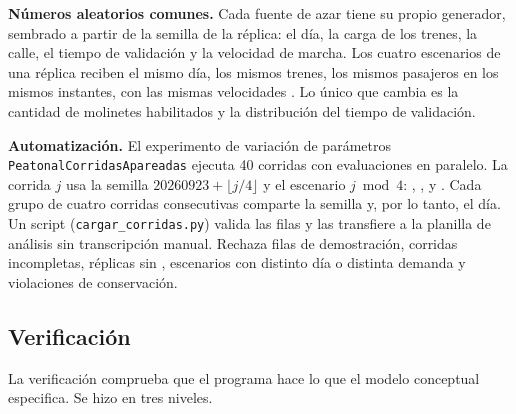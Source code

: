 \textbf{Números aleatorios comunes.} Cada fuente de azar tiene su propio generador, sembrado a partir de la
semilla de la réplica: el día, la carga de los trenes, la calle, el tiempo de validación y la velocidad de
marcha. Los cuatro escenarios de una réplica reciben el mismo día, los mismos trenes, los mismos pasajeros en
los mismos instantes, con las mismas velocidades \parencite[cap.~11]{law2015}. Lo único que cambia es la
cantidad de molinetes habilitados y la distribución del tiempo de validación.

\textbf{Automatización.} El experimento de variación de parámetros \texttt{PeatonalCorridasApareadas}
ejecuta 40 corridas con evaluaciones en paralelo. La corrida $j$ usa la semilla $20260923 + \lfloor j/4 \rfloor$
y el escenario $j \bmod 4$: \EO{}, \EI{}, \ET{} y \EIT{}. Cada grupo de cuatro corridas consecutivas comparte la
semilla y, por lo tanto, el día. Un script (\texttt{cargar\_corridas.py}) valida las filas y las transfiere a la
planilla de análisis sin transcripción manual. Rechaza filas de demostración, corridas incompletas, réplicas sin
\EO{}, escenarios con distinto día o distinta demanda y violaciones de conservación.

\subsection{Verificación}
\label{anx:verificacion}

La verificación comprueba que el programa hace lo que el modelo conceptual especifica. Se hizo en tres
niveles.


